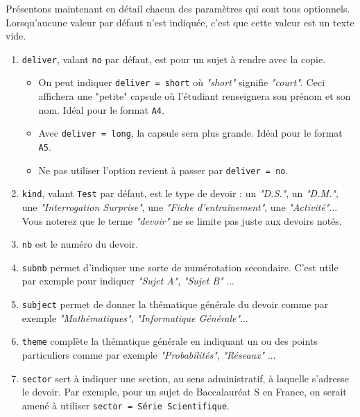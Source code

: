 \documentclass[12pt,a4paper]{scrartcl}
\begin{document}
Présentons maintenant en détail chacun des paramètres qui sont tous optionnels. Lorsqu'aucune valeur par défaut n'est indiquée, c'est que cette valeur est un texte vide.

\begin{enumerate}
    \item \verb+deliver+, valant \verb+no+ par défaut, est pour un sujet à rendre avec la copie.
    \begin{itemize}
        \setlength\itemsep{0em}

        \item On peut indiquer \verb+deliver = short+ où \emph{"short"} signifie \emph{"court"}. Ceci affichera une "petite" capsule où l'étudiant renseignera son prénom et son nom. Idéal pour le format \verb+A4+.

        \item Avec \verb+deliver = long+, la capsule sera plus grande. Idéal pour le format \verb+A5+.

        \item Ne pas utiliser l'option revient à passer par \verb+deliver = no+.
    \end{itemize}

    \item \verb+kind+, valant \verb+Test+ par défaut, est le type de devoir : un \emph{"D.S."}, un \emph{"D.M."}, une \emph{"Interrogation Surprise"}, une \emph{"Fiche d'entraînement"}, une \emph{"Activité"}...
    Vous noterez que le terme \emph{"devoir"} ne se limite pas juste aux devoirs notés.

    \item \verb+nb+ est le numéro du devoir.

    \item \verb+subnb+ permet d'indiquer une sorte de numérotation secondaire. C'est utile par exemple pour indiquer \emph{"Sujet A"}, \emph{"Sujet B"} ...

    \item \verb+subject+ permet de donner la thématique générale du devoir comme par exemple \emph{"Mathématiques"}, \emph{"Informatique Générale"}...

    \item \verb+theme+ complète la thématique générale en indiquant un ou des points particuliers comme par exemple \emph{"Probabilités"}, \emph{"Réseaux"} ...

    \item \verb+sector+ sert à indiquer une section, au sens administratif, à laquelle s'adresse le devoir. Par exemple, pour un sujet de Baccalauréat S en France, on serait amené à utiliser \verb+sector = Série Scientifique+.


\end{enumerate}
\end{document}
